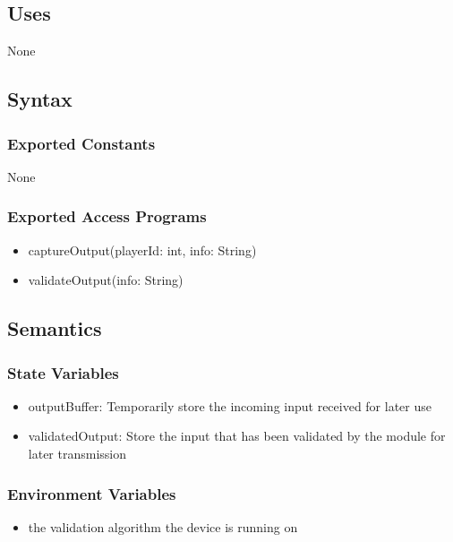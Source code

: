 \documentclass[12pt, titlepage]{article}
\begin{document}
\subsection{Uses}
\hspace{1.5em}None

\subsection{Syntax}

\subsubsection{Exported Constants}
\hspace{1.5em}None

\subsubsection{Exported Access Programs}

\begin{itemize}
\item captureOutput(playerId: int, info: String)
\item validateOutput(info: String)
\end{itemize}

\subsection{Semantics}

\subsubsection{State Variables}
\begin{itemize}
\item outputBuffer: Temporarily store the incoming input received for later use
\item validatedOutput: Store the input that has been validated by the module for later transmission
\end{itemize}

\subsubsection{Environment Variables}
\begin{itemize}
\item the validation algorithm the device is running on
\end{itemize}
\end{document}
